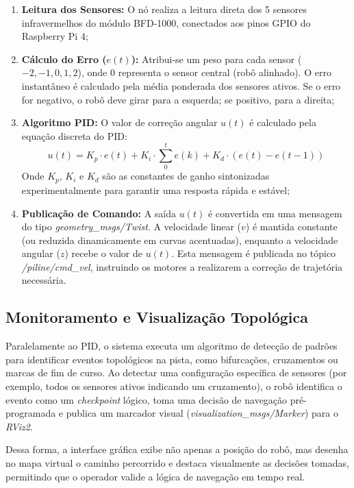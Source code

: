 \begin{enumerate}
    \item \textbf{Leitura dos Sensores:} O nó realiza a leitura direta dos 5 sensores infravermelhos do módulo BFD-1000, conectados aos pinos GPIO do Raspberry Pi 4;

    \item \textbf{Cálculo do Erro ($e(t)$):} Atribui-se um peso para cada sensor ($-2, -1, 0, 1, 2$), onde $0$ representa o sensor central (robô alinhado). O erro instantâneo é calculado pela média ponderada dos sensores ativos. Se o erro for negativo, o robô deve girar para a esquerda; se positivo, para a direita;

    \item \textbf{Algoritmo PID:} O valor de correção angular $u(t)$ é calculado pela equação discreta do PID:
    \begin{equation}
        u(t) = K_p \cdot e(t) + K_i \cdot \sum_{0}^{t} e(k) + K_d \cdot (e(t) - e(t-1))
    \end{equation}
    Onde $K_p$, $K_i$ e $K_d$ são as constantes de ganho sintonizadas experimentalmente para garantir uma resposta rápida e estável;

    \item \textbf{Publicação de Comando:} A saída $u(t)$ é convertida em uma mensagem do tipo \textit{geometry\_msgs/Twist}. A velocidade linear ($v$) é mantida constante (ou reduzida dinamicamente em curvas acentuadas), enquanto a velocidade angular ($z$) recebe o valor de $u(t)$. Esta mensagem é publicada no tópico \textit{/piline/cmd\_vel}, instruindo os motores a realizarem a correção de trajetória necessária.
\end{enumerate}


\subsection{Monitoramento e Visualização Topológica}

Paralelamente ao PID, o sistema executa um algoritmo de detecção de padrões para identificar eventos topológicos na pista, como bifurcações, cruzamentos ou marcas de fim de curso. Ao detectar uma configuração específica de sensores (por exemplo, todos os sensores ativos indicando um cruzamento), o robô identifica o evento como um \textit{checkpoint} lógico, toma uma decisão de navegação pré-programada e publica um marcador visual (\textit{visualization\_msgs/Marker}) para o \textit{RViz2}.

Dessa forma, a interface gráfica exibe não apenas a posição do robô, mas desenha no mapa virtual o caminho percorrido e destaca visualmente as decisões tomadas, permitindo que o operador valide a lógica de navegação em tempo real.


